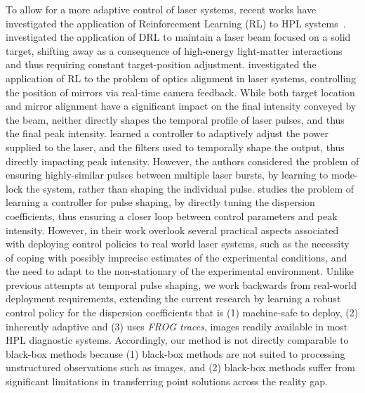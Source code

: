 To allow for a more adaptive control of laser systems, recent works have investigated the application of Reinforcement Learning (RL) to HPL systems~\citep{kuprikov2022deep, rakhmatulin2024reinforcement, mareev2023self, capuano2023temporl}. 
\citet{mareev2023self} investigated the application of DRL to maintain a laser beam focused on a solid target, shifting away as a consequence of high-energy light-matter interactions and thus requiring constant target-position adjustment. 
\cite{rakhmatulin2024reinforcement} investigated the application of RL to the problem of optics alignment in laser systems, controlling the position of mirrors via real-time camera feedback. 
While both target location and mirror alignment have a significant impact on the final intensity conveyed by the beam, neither directly shapes the temporal profile of laser pulses, and thus the final peak intensity. 
\cite{kuprikov2022deep} learned a controller to adaptively adjust the power supplied to the laser, and the filters used to temporally shape the output, thus directly impacting peak intensity. 
However, the authors considered the problem of ensuring highly-similar pulses between multiple laser bursts, by learning to mode-lock the system, rather than shaping the individual pulse. 
\cite{capuano2023temporl} studies the problem of learning a controller for pulse shaping, by directly tuning the dispersion coefficients, thus ensuring a closer loop between control parameters and peak intensity. 
However, in their work \cite{capuano2023temporl} overlook several practical aspects associated with deploying control policies to real world laser systems, such as the necessity of coping with possibly imprecise estimates of the experimental conditions, and the need to adapt to the non-stationary of the experimental environment. 
Unlike previous attempts at temporal pulse shaping, we work backwards from real-world deployment requirements, extending the current research by learning a robust control policy for the dispersion coefficients that is (1) machine-safe to deploy, (2) inherently adaptive and (3) uses \textit{FROG traces}, images readily available in most HPL diagnostic systems.
Accordingly, our method is not directly comparable to black-box methods because (1) black-box methods are not suited to processing unstructured observations such as images, and (2) black-box methods suffer from significant limitations in transferring point solutions across the reality gap.


